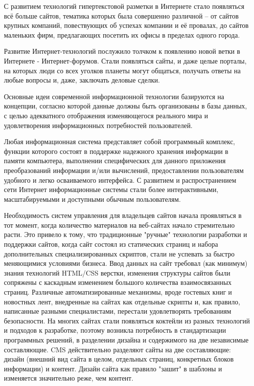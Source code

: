 С развитием технологий гипертекстовой разметки в Интернете стало появляться всё больше сайтов, тематика которых была совершенно различной – от сайтов крупных компаний, повествующих об успехах компании и её провалах, до сайтов маленьких фирм, предлагающих посетить их офисы в пределах одного города.

Развитие Интернет-технологий послужило толчком к появлению новой ветки в Интернете - Интернет-форумов. Стали появляться сайты, и даже целые порталы, на которых люди со всех уголков планеты могут общаться, получать ответы на любые вопросы и, даже, заключать деловые сделки.

Основные идеи современной информационной технологии базируются на концепции, согласно которой данные должны быть организованы в базы данных, с целью адекватного отображения изменяющегося реального мира и удовлетворения информационных потребностей пользователей.

Любая информационная система представляет собой программный комплекс, функции которого состоят в поддержке надежного хранения информации в памяти компьютера, выполнении специфических для данного приложения преобразований информации и/или вычислений, предоставлении пользователям удобного и легко осваиваемого интерфейса. С развитием и распространением сети Интернет информационные системы стали более интерактивными, масштабируемыми и доступными обычным пользователям.

Необходимость систем управления для владельцев сайтов начала проявляться в тот момент, когда количество материалов на веб-сайтах начало стремительно расти. Это привело к тому, что традиционные "ручные" технологии разработки и поддержки сайтов, когда сайт состоял из статических страниц и набора дополнительных специализированных скриптов, стали не успевать за быстро меняющимися условиями бизнеса. Ввод данных на сайт требовал (как минимум) знания технологий HTML/CSS верстки, изменения структуры сайтов были сопряжены с каскадным изменением большого количества взаимосвязанных страниц. Различные автоматизированные механизмы, вроде гостевых книг и новостных лент, внедренные на сайтах как отдельные скрипты и, как правило, написанные разными специалистами, перестали удовлетворять требованиям безопасности. На многих сайтах стали появляться коктейли из разных технологий и подходов к разработке, поэтому возникла потребность в стандартизации программных решений, в разделении дизайна и содержимого на две независимые составляющие. CMS действительно разделяют сайты на две составляющие: дизайн (внешний вид сайта в целом, отдельных страниц, конкретных блоков информации) и контент. Дизайн сайта как правило "зашит" в шаблоны и изменяется значительно реже, чем контент.

